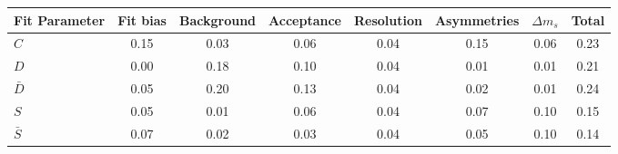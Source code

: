 \begin{tabular}{l  c  c  c  c  c  c  | c }
\hline
\hline
Fit Parameter & Fit bias & Background & Acceptance & Resolution & Asymmetries & $\Delta m_{s}$ &  Total  \\ 
\hline
$C$ & 0.15 & 0.03 & 0.06 & 0.04 & 0.15 & 0.06 & 0.23 \\ 
$D$ & 0.00 & 0.18 & 0.10 & 0.04 & 0.01 & 0.01 & 0.21 \\ 
$\bar{D}$ & 0.05 & 0.20 & 0.13 & 0.04 & 0.02 & 0.01 & 0.24 \\ 
$S$ & 0.05 & 0.01 & 0.06 & 0.04 & 0.07 & 0.10 & 0.15 \\ 
$\bar{S}$ & 0.07 & 0.02 & 0.03 & 0.04 & 0.05 & 0.10 & 0.14 \\ 
\hline
\hline
\end{tabular}
